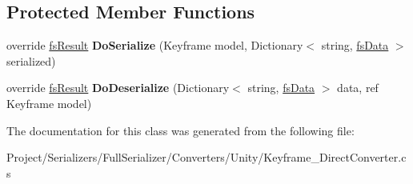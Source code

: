 \subsection*{Protected Member Functions}
\begin{DoxyCompactItemize}
\item 
\mbox{\label{class_full_serializer_1_1_internal_1_1_direct_converters_1_1_keyframe___direct_converter_af16890a5241dfeb04a749245f64dd859}} 
override \hyperlink{struct_full_serializer_1_1fs_result}{fs\+Result} {\bfseries Do\+Serialize} (Keyframe model, Dictionary$<$ string, \hyperlink{class_full_serializer_1_1fs_data}{fs\+Data} $>$ serialized)
\item 
\mbox{\label{class_full_serializer_1_1_internal_1_1_direct_converters_1_1_keyframe___direct_converter_a42df774ee6b28aa10dd727040969154b}} 
override \hyperlink{struct_full_serializer_1_1fs_result}{fs\+Result} {\bfseries Do\+Deserialize} (Dictionary$<$ string, \hyperlink{class_full_serializer_1_1fs_data}{fs\+Data} $>$ data, ref Keyframe model)
\end{DoxyCompactItemize}


The documentation for this class was generated from the following file\+:\begin{DoxyCompactItemize}
\item 
Project/\+Serializers/\+Full\+Serializer/\+Converters/\+Unity/Keyframe\+\_\+\+Direct\+Converter.\+cs\end{DoxyCompactItemize}
